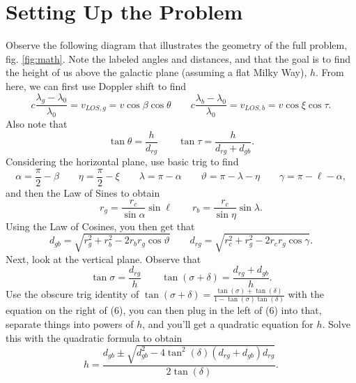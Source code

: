 \documentclass[12pt]{article}
\begin{document}
	\section{Setting Up the Problem}
	\par Observe the following diagram that illustrates the geometry of the full problem, fig. \ref{fig:math}. Note the labeled angles and distances, and that the goal is to find the height of us above the galactic plane (assuming a flat Milky Way), $h$. From here, we can first use Doppler shift to find 
	\begin{equation}
		c\frac{\lambda_g-\lambda_0}{\lambda_0}=v_{LOS, g}=v\cos\beta\cos\theta \qquad c\frac{\lambda_b-\lambda_0}{\lambda_0}=v_{LOS, b}=v\cos\xi\cos\tau.
	\end{equation}
	Also note that
	\begin{equation}
		\tan\theta=\frac{h}{d_{rg}} \qquad \tan\tau=\frac{h}{d_{rg}+d_{gb}}.
	\end{equation}
	Considering the horizontal plane, use basic trig to find
	\begin{equation}
		\alpha = \frac{\pi}{2} - \beta \qquad \eta = \frac{\pi}{2} - \xi \qquad \lambda = \pi - \alpha \qquad \vartheta=\pi-\lambda-\eta \qquad \gamma=\pi-\ell-\alpha,
	\end{equation}
	and then the Law of Sines to obtain
	\begin{equation}
		r_g=\frac{r_c}{\sin\alpha}\sin\ell \qquad r_b=\frac{r_c}{\sin\eta}\sin\lambda.
	\end{equation}
		Using the Law of Cosines, you then get that
	\begin{equation}
		d_{gb}=\sqrt{r_g^2+r_b^2-2r_br_g\cos\vartheta} \qquad d_{rg}=\sqrt{r_c^2+r_g^2-2r_cr_g\cos\gamma}.
	\end{equation}
		Next, look at the vertical plane. Observe that
	\begin{equation}
	\tan\sigma=\frac{d_{rg}}{h} \qquad \tan(\sigma+\delta)=\frac{d_{rg}+d_{gb}}{h}.
	\end{equation}
	Use the obscure trig identity of $\displaystyle \tan(\sigma+\delta)=\frac{\tan(\sigma)+\tan(\delta)}{1-\tan(\sigma)\tan(\delta)}$ with the equation on the right of (6), you can then plug in the left of (6) into that, separate things  into powers of $h$, and you'll get a quadratic equation for $h$. Solve this with the quadratic formula to obtain 
	\begin{equation}
	h=\frac{d_{gb}\pm\sqrt{d_{gb}^2-4\tan^2(\delta)(d_{rg}+d_{gb})d_{rg}}}{2\tan(\delta)}.
	\end{equation}
\end{document}
